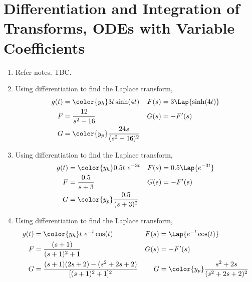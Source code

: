 \section{Differentiation and Integration of Transforms, ODEs with Variable Coefficients}
\begin{enumerate}
    \item Refer notes. TBC.

    \item Using differentiation to find the Laplace transform,
          \begin{align}
              g(t) & = \color{y_h} 3t \sinh(4t)             &
              F(s) & = 3\Lap\{\sinh(4t)\}                     \\
              F    & = \frac{12}{s^2 -16}                   &
              G(s) & = -F'(s)                                 \\
              G    & = \color{y_p} \frac{24s}{(s^2 - 16)^2}
          \end{align}

    \item Using differentiation to find the Laplace transform,
          \begin{align}
              g(t) & = \color{y_h} 0.5 t\ e^{-3t}        &
              F(s) & = 0.5 \Lap\{ e^{-3t} \}               \\
              F    & = \frac{0.5}{s + 3}                 &
              G(s) & = -F'(s)                              \\
              G    & = \color{y_p} \frac{0.5}{(s + 3)^2}
          \end{align}

    \item Using differentiation to find the Laplace transform,
          \begin{align}
              g(t) & = \color{y_h} t\ e^{-t}\cos(t)                               &
              F(s) & = \Lap\{ e^{-t}\cos(t) \}                                      \\
              F    & = \frac{(s + 1)}{(s + 1)^2 + 1}                              &
              G(s) & = -F'(s)                                                       \\
              G    & = \frac{(s + 1)(2s + 2) - (s^2 + 2s + 2)}{[(s + 1)^2 + 1]^2} &
              G    & = \color{y_p} \frac{s^2 + 2s}{(s^2 + 2s + 2)^2}
          \end{align}


\end{enumerate}
